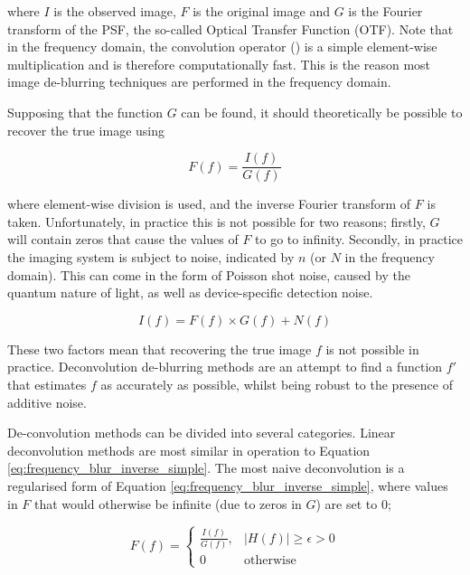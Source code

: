 \noindent
where $I$ is the observed image, $F$ is the original image and $G$ is the Fourier transform of the PSF, the so-called Optical Transfer Function (OTF).
Note that in the frequency domain, the convolution operator (\textasteriskcentered) is a simple element-wise multiplication and is therefore computationally fast.
This is the reason most image de-blurring techniques are performed in the frequency domain.

Supposing that the function $G$ can be found, it should theoretically be possible to recover the true image using

\begin{equation}
\label{eq:frequency_blur_inverse_simple}
F(f) = \frac{I(f)}{G(f)}
\end{equation}

\noindent
where element-wise division is used, and the inverse Fourier transform of $F$ is taken.
Unfortunately, in practice this is not possible for two reasons; firstly, $G$ will contain zeros that cause the values of $F$ to go to infinity.
Secondly, in practice the imaging system is subject to noise, indicated by $n$ (or $N$ in the frequency domain).
This can come in the form of Poisson shot noise, caused by the quantum nature of light, as well as device-specific detection noise.

\begin{equation}
\label{eq:frequency_blur_full}
I(f) = F(f) \times G(f) + N(f)
\end{equation}

These two factors mean that recovering the true image $f$ is not possible in practice.
Deconvolution de-blurring methods are an attempt to find a function $f'$ that estimates $f$ as accurately as possible, whilst being robust to the presence of additive noise.

De-convolution methods can be divided into several categories.
Linear deconvolution methods are most similar in operation to Equation \ref{eq:frequency_blur_inverse_simple}.
The most naive deconvolution is a regularised form of Equation \ref{eq:frequency_blur_inverse_simple}, where values in $F$ that would otherwise be infinite (due to zeros in $G$) are set to 0;

\begin{equation}
\label{eq:regularised_deconvolution}
F(f) = \begin{cases}
	\frac{I(f)}{G(f)},	& \left| H(f) \right| \ge \epsilon> 0 \\
	0					& \text{otherwise}
\end{cases}
\end{equation}

